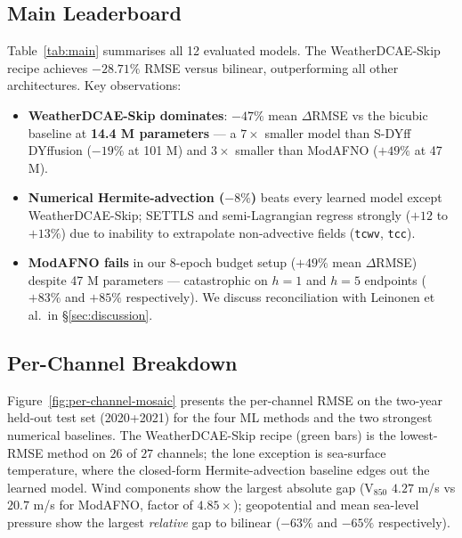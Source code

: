 \documentclass[10pt,letterpaper,twocolumn]{article}
\begin{document}
\subsection{Main Leaderboard}

Table~\ref{tab:main} summarises all 12 evaluated models. The WeatherDCAE-Skip
recipe achieves $-28.71\%$ RMSE versus bilinear, outperforming all other
architectures. Key observations:



\begin{itemize}
\item \textbf{WeatherDCAE-Skip dominates}: $-47\%$ mean $\Delta$RMSE vs the
      bicubic baseline at \textbf{14.4 M parameters} --- a $7\times$
      smaller model than S-DYff DYffusion ($-19\%$ at 101 M) and $3\times$
      smaller than ModAFNO ($+49\%$ at 47 M).

\item \textbf{Numerical Hermite-advection ($-8\%$)} beats every learned
      model except WeatherDCAE-Skip; SETTLS and semi-Lagrangian regress
      strongly ($+12$ to $+13\%$) due to inability to extrapolate
      non-advective fields (\texttt{tcwv}, \texttt{tcc}).

\item \textbf{ModAFNO fails} in our 8-epoch budget setup ($+49\%$ mean
      $\Delta$RMSE) despite 47 M parameters --- catastrophic on
      $h{=}1$ and $h{=}5$ endpoints ($+83\%$ and $+85\%$ respectively).
      We discuss reconciliation with Leinonen et al.\ in
      \S\ref{sec:discussion}.
\end{itemize}

\subsection{Per-Channel Breakdown}
\label{sec:per-channel}

Figure~\ref{fig:per-channel-mosaic} presents the per-channel RMSE on the
two-year held-out test set (2020+2021) for the four ML methods and the
two strongest numerical baselines. The WeatherDCAE-Skip recipe (green bars)
is the lowest-RMSE method on $26$ of $27$ channels; the lone exception
is sea-surface temperature, where the closed-form Hermite-advection
baseline edges out the learned model. Wind components show the largest
absolute gap (V$_{850}$ $4.27$ m/s vs $20.7$ m/s for ModAFNO, factor
of $4.85{\times}$); geopotential and mean sea-level pressure show the
largest \emph{relative} gap to bilinear ($-63\%$ and $-65\%$
respectively).
\end{document}
